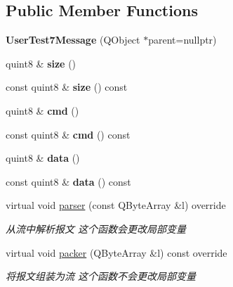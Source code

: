 \subsection*{Public Member Functions}
\begin{DoxyCompactItemize}
\item 
\mbox{\label{class_user_test7_message_a34da361fa7af1325b7b9a0aa49cd7442}} 
{\bfseries User\+Test7\+Message} (Q\+Object $\ast$parent=nullptr)
\item 
\mbox{\label{class_user_test7_message_a87ed553d6dc2368eb5704e61275cc02c}} 
quint8 \& {\bfseries size} ()
\item 
\mbox{\label{class_user_test7_message_a1549806bab2ab3b3a03dfd4ec0fe8b47}} 
const quint8 \& {\bfseries size} () const
\item 
\mbox{\label{class_user_test7_message_abc0de13a3d7a145260dbe699c5e496bc}} 
quint8 \& {\bfseries cmd} ()
\item 
\mbox{\label{class_user_test7_message_a0f7d9cb3abf97de44ac0a274af5dd842}} 
const quint8 \& {\bfseries cmd} () const
\item 
\mbox{\label{class_user_test7_message_aec2f774d96fbee13bf1a07fc450fc6ff}} 
quint8 \& {\bfseries data} ()
\item 
\mbox{\label{class_user_test7_message_afeda5c6d523524568b52c97b14f4fb4f}} 
const quint8 \& {\bfseries data} () const
\item 
virtual void \mbox{\hyperlink{class_user_test7_message_ae70deda008c21d6edd2a5b4bcc29590f}{parser}} (const Q\+Byte\+Array \&l) override
\begin{DoxyCompactList}\small\item\em 从流中解析报文 这个函数会更改局部变量 \end{DoxyCompactList}\item 
virtual void \mbox{\hyperlink{class_user_test7_message_a4b9df59225f5bec202848849c836fd80}{packer}} (Q\+Byte\+Array \&l) const override
\begin{DoxyCompactList}\small\item\em 将报文组装为流 这个函数不会更改局部变量 \end{DoxyCompactList}\end{DoxyCompactItemize}


